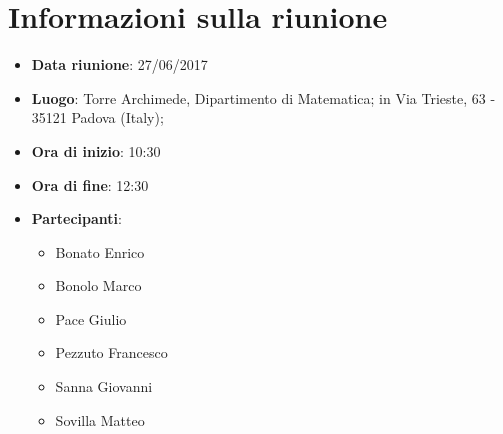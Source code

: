 \documentclass[../AnalisiDeiRequisiti.tex]{subfiles}
\begin{document}
	\section*{Informazioni sulla riunione}
		\begin{itemize}
			\item \textbf{Data riunione}: 27/06/2017
			\item \textbf{Luogo}: Torre Archimede, Dipartimento di Matematica; in Via Trieste, 63 - 35121 Padova (Italy);
			\item \textbf{Ora di inizio}: 10:30
			\item \textbf{Ora di fine}: 12:30
			\item \textbf{Partecipanti}:
				\begin{itemize}
					\item Bonato Enrico
					\item Bonolo Marco
					\item Pace Giulio
					\item Pezzuto Francesco
					\item Sanna Giovanni
					\item Sovilla Matteo
				\end{itemize}
		\end{itemize}
\end{document}
